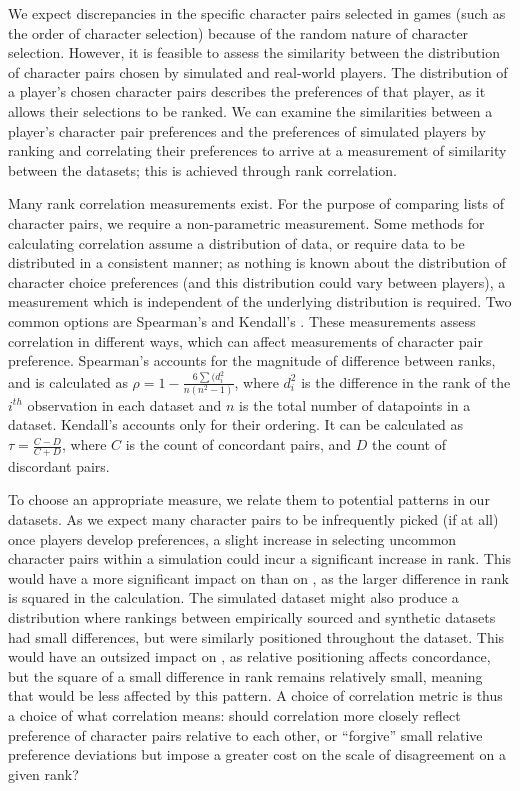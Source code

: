 We expect discrepancies in the specific character pairs selected in games (such
as the order of character selection) because of the random nature of character
selection. However, it is feasible to assess the similarity between the
distribution of character pairs chosen by simulated and real-world players. The
distribution of a player's chosen character pairs describes the preferences of
that player, as it allows their selections to be ranked. We can examine the
similarities between a player's character pair preferences and the preferences
of simulated players by ranking and correlating their preferences to arrive at a
measurement of similarity between the datasets; this is achieved through
rank correlation.


Many rank correlation measurements exist. For the purpose of comparing lists of
character pairs, we require a non-parametric measurement. Some methods for
calculating correlation assume a distribution of data, or require data to be
distributed in a consistent manner; as nothing is known about the distribution
of character choice preferences (and this distribution could vary between
players), a measurement which is independent of the underlying distribution is
required. Two common options are Spearman's \rho and Kendall's \tau.
These measurements assess correlation in different ways, which can affect
measurements of character pair preference. Spearman's \rho accounts for the
magnitude of difference between ranks, and is calculated as $\rho = 1 - \frac{6
\sum (d^{2}_{i}}{n(n^{2}-1)}$, where $d^{2}_{i}$ is the difference in the rank
of the $i^{th}$ observation in each dataset and $n$ is the total number of
datapoints in a dataset. Kendall's \tau{} accounts only for their ordering. It
can be calculated as $\tau = \frac{C - D}{C + D}$, where $C$ is the count of
concordant pairs, and $D$ the count of discordant pairs.

To choose an appropriate measure, we relate them to potential patterns in our
datasets. As we expect many character pairs to be infrequently picked (if at
all) once players develop preferences, a slight increase in selecting uncommon
character pairs within a simulation could incur a significant increase in rank.
This would have a more significant impact on \rho{} than on \tau{}, as the
larger difference in rank is squared in the calculation. The simulated dataset
might also produce a distribution where rankings between empirically sourced and
synthetic datasets had small differences, but were similarly positioned
throughout the dataset. This would have an outsized impact on \tau{}, as
relative positioning affects concordance, but the square of a small difference
in rank remains relatively small, meaning that \rho{} would be less affected by
this pattern. A choice of correlation metric is thus a choice of what
correlation means: should correlation more closely reflect preference of
character pairs relative to each other, or ``forgive'' small relative preference
deviations but impose a greater cost on the scale of disagreement on a given
rank?

